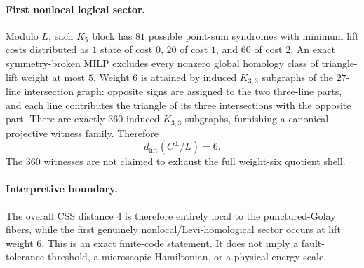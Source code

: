 \paragraph{First nonlocal logical sector.}
Modulo $L$, each $K_5$ block has $81$ possible point-sum syndromes with minimum lift costs distributed as $1$ state of cost $0$, $20$ of cost $1$, and $60$ of cost $2$.  An exact symmetry-broken MILP excludes every nonzero global homology class of triangle-lift weight at most $5$.  Weight $6$ is attained by induced $K_{3,3}$ subgraphs of the $27$-line intersection graph: opposite signs are assigned to the two three-line parts, and each line contributes the triangle of its three intersections with the opposite part.  There are exactly $360$ induced $K_{3,3}$ subgraphs, furnishing a canonical projective witness family.  Therefore
\[
\boxed{d_{\mathrm{lift}}(C^\perp/L)=6.}
\]
The $360$ witnesses are not claimed to exhaust the full weight-six quotient shell.

\paragraph{Interpretive boundary.}
The overall CSS distance $4$ is therefore entirely local to the punctured-Golay fibers, while the first genuinely nonlocal/Levi-homological sector occurs at lift weight $6$.  This is an exact finite-code statement.  It does not imply a fault-tolerance threshold, a microscopic Hamiltonian, or a physical energy scale.
